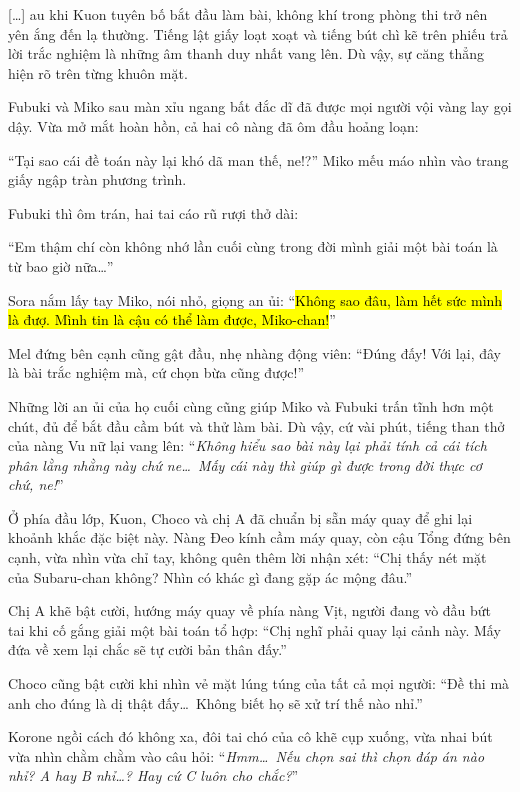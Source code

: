 \documentclass[../main.tex]{subfiles}
\begin{document}
\il

[\dots] au khi Kuon tuyên bố bắt đầu làm bài, không khí trong phòng thi trở nên yên ắng đến lạ thường. Tiếng lật giấy loạt xoạt và tiếng bút chì kẽ trên phiếu trả lời trắc nghiệm là những âm thanh duy nhất vang lên. Dù vậy, sự căng thẳng hiện rõ trên từng khuôn mặt.

Fubuki và Miko sau màn xỉu ngang bất đắc dĩ đã được mọi người vội vàng lay gọi dậy. Vừa mở mắt hoàn hồn, cả hai cô nàng đã ôm đầu hoảng loạn:

``Tại sao cái đề toán này lại khó dã man thế, ne!?'' Miko mếu máo nhìn vào trang giấy ngập tràn phương trình.

Fubuki thì ôm trán, hai tai cáo rũ rượi thở dài:

``Em thậm chí còn không nhớ lần cuối cùng trong đời mình giải một bài toán là từ bao giờ nữa\dots''

Sora nắm lấy tay Miko, nói nhỏ, giọng an ủi: ``\hl{Không sao đâu, làm hết sức mình là đượ. Mình tin là cậu có thể làm được, Miko-chan!}''

Mel đứng bên cạnh cũng gật đầu, nhẹ nhàng động viên: ``Đúng đấy! Với lại, đây là bài trắc nghiệm mà, cứ chọn bừa cũng được!''

Những lời an ủi của họ cuối cùng cũng giúp Miko và Fubuki trấn tĩnh hơn một chút, đủ để bắt đầu cầm bút và thử làm bài. Dù vậy, cứ vài phút, tiếng than thở của nàng Vu nữ lại vang lên: ``\textit{Không hiểu sao bài này lại phải tính cả cái tích phân lằng nhằng này chứ ne\dots\ Mấy cái này thì giúp gì được trong đời thực cơ chứ, ne!}''

Ở phía đầu lớp, Kuon, Choco và chị A đã chuẩn bị sẵn máy quay để ghi lại khoảnh khắc đặc biệt này. Nàng Đeo kính cầm máy quay, còn cậu Tổng đứng bên cạnh, vừa nhìn vừa chỉ tay, không quên thêm lời nhận xét: ``Chị thấy nét mặt của Subaru-chan không? Nhìn có khác gì đang gặp ác mộng đâu.''

Chị A khẽ bật cười, hướng máy quay về phía nàng Vịt, người đang vò đầu bứt tai khi cố gắng giải một bài toán tổ hợp: ``Chị nghĩ phải quay lại cảnh này. Mấy đứa về xem lại chắc sẽ tự cười bản thân đấy.''

Choco cũng bật cười khi nhìn vẻ mặt lúng túng của tất cả mọi người: ``Đề thi mà anh cho đúng là dị thật đấy\dots\ Không biết họ sẽ xử trí thế nào nhỉ.''

Korone ngồi cách đó không xa, đôi tai chó của cô khẽ cụp xuống, vừa nhai bút vừa nhìn chằm chằm vào câu hỏi: ``\textit{Hmm\dots\ Nếu chọn sai thì chọn đáp án nào nhỉ? A hay B nhỉ\dots? Hay cứ C luôn cho chắc?}''
\end{document}
